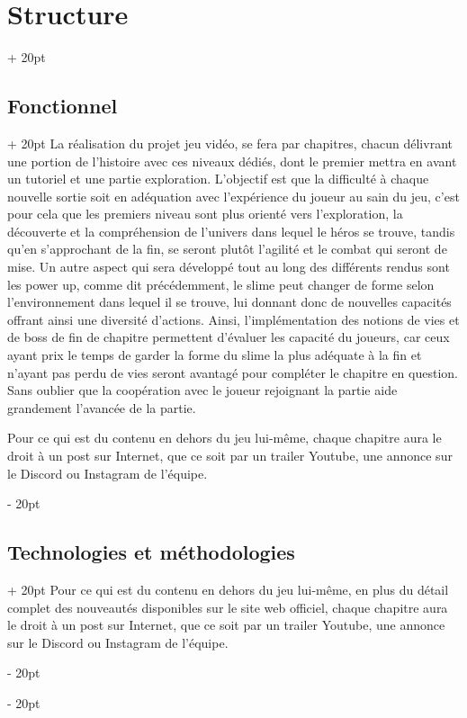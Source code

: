 \documentclass[a4paper, 12pt, twoside]{article}
\newcommand{\ind}[1][20pt]{\advance\leftskip + #1}
\newcommand{\deind}[1][20pt]{\advance\leftskip - #1}
\newenvironment{indt}[2][20pt]{#2 \par \ind[#1]}{\par \deind} %
\begin{document}
    \vspace{12pt}

    \newpage

    \begin{indt}{\section{Structure}}
        \begin{indt}{\subsection{Fonctionnel}}
            La réalisation du projet jeu vidéo, se fera par chapitres, chacun délivrant une portion de l'histoire avec ces niveaux dédiés, dont le premier mettra en avant un tutoriel et une partie exploration. L'objectif est que la difficulté à chaque nouvelle sortie soit en adéquation avec l'expérience du joueur au sain du jeu, c'est pour cela que les premiers niveau sont plus orienté vers l'exploration, la découverte et la compréhension de l'univers dans lequel le héros se trouve, tandis qu'en s'approchant de la fin, se seront plutôt l'agilité et le combat qui seront de mise. Un autre aspect qui sera développé tout au long des différents rendus sont les power up, comme dit précédemment, le slime peut changer de forme selon l'environnement dans lequel il se trouve, lui donnant donc de nouvelles capacités offrant ainsi une diversité d'actions. Ainsi, l'implémentation des notions de vies et de boss de fin de chapitre permettent d'évaluer les capacité du joueurs, car ceux ayant prix le temps de garder la forme du slime la plus adéquate à la fin et n'ayant pas perdu de vies seront avantagé pour compléter le chapitre en question. Sans oublier que la coopération avec le joueur rejoignant la partie aide grandement l'avancée de la partie.

            Pour ce qui est du contenu en dehors du jeu lui-même, chaque chapitre aura le droit à un post sur Internet, que ce soit par un trailer Youtube, une annonce sur le Discord ou Instagram de l'équipe.
        \end{indt} 

        \begin{indt}{\subsection{Technologies et méthodologies}}
            Pour ce qui est du contenu en dehors du jeu lui-même, en plus du détail complet des nouveautés disponibles sur le site web officiel, chaque chapitre aura le droit à un post sur Internet, que ce soit par un trailer Youtube, une annonce sur le Discord ou Instagram de l'équipe.
        \end{indt} 


\end{indt}
\end{document}
